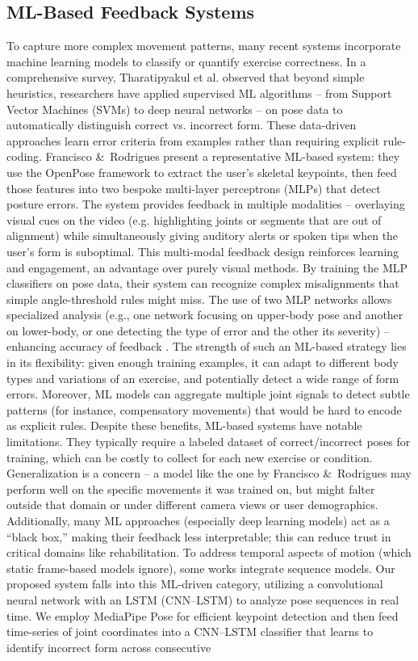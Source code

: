 \documentclass{article}
\begin{document}
\subsection{ML-Based Feedback Systems} To capture more complex movement patterns, many recent systems incorporate machine learning models to classify or quantify exercise correctness. In a comprehensive survey, Tharatipyakul et al. \cite{Tharatipyakul2024Review} observed that beyond simple heuristics, researchers have applied supervised ML algorithms – from Support Vector Machines (SVMs) to deep neural networks – on pose data to automatically distinguish correct vs. incorrect form. These data-driven approaches learn error criteria from examples rather than requiring explicit rule-coding. Francisco \&\ Rodrigues \cite{Francisco2022} present a representative ML-based system: they use the OpenPose framework to extract the user’s skeletal keypoints, then feed those features into two bespoke multi-layer perceptrons (MLPs) that detect posture errors. The system provides feedback in multiple modalities – overlaying visual cues on the video (e.g. highlighting joints or segments that are out of alignment) while simultaneously giving auditory alerts or spoken tips when the user’s form is suboptimal. This multi-modal feedback design reinforces learning and engagement, an advantage over purely visual methods. By training the MLP classifiers on pose data, their system can recognize complex misalignments that simple angle-threshold rules might miss. The use of two MLP networks allows specialized analysis (e.g., one network focusing on upper-body pose and another on lower-body, or one detecting the type of error and the other its severity) – enhancing accuracy of feedback \cite{Francisco2022}. The strength of such an ML-based strategy lies in its flexibility: given enough training examples, it can adapt to different body types and variations of an exercise, and potentially detect a wide range of form errors. Moreover, ML models can aggregate multiple joint signals to detect subtle patterns (for instance, compensatory movements) that would be hard to encode as explicit rules. Despite these benefits, ML-based systems have notable limitations. They typically require a labeled dataset of correct/incorrect poses for training, which can be costly to collect for each new exercise or condition. Generalization is a concern – a model like the one by Francisco \&\ Rodrigues \cite{Francisco2022} may perform well on the specific movements it was trained on, but might falter outside that domain or under different camera views or user demographics. Additionally, many ML approaches (especially deep learning models) act as a “black box,” making their feedback less interpretable; this can reduce trust in critical domains like rehabilitation. To address temporal aspects of motion (which static frame-based models ignore), some works integrate sequence models. Our proposed system falls into this ML-driven category, utilizing a convolutional neural network with an LSTM (CNN–LSTM) to analyze pose sequences in real time. We employ MediaPipe Pose for efficient keypoint detection and then feed time-series of joint coordinates into a CNN–LSTM classifier that learns to identify incorrect form across consecutive 
\end{document}
